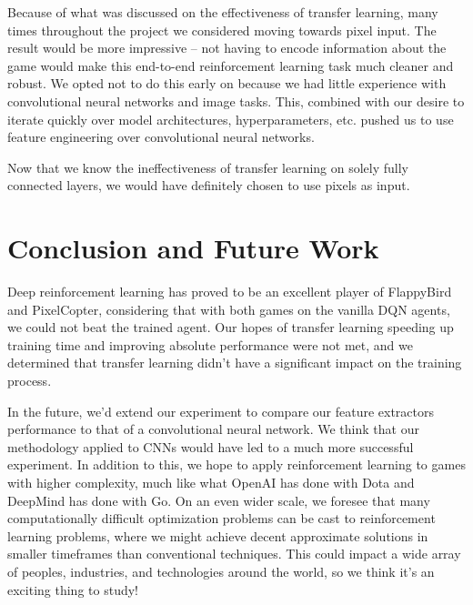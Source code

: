 \documentclass{article}
\begin{document}
Because of what was discussed on the effectiveness of transfer learning, many times throughout the project we considered moving towards pixel input. 
The result would be more impressive -- not having to encode information about the game would make this end-to-end reinforcement learning task much cleaner and robust.
We opted not to do this early on because we had little experience with convolutional neural networks and image tasks.
This, combined with our desire to iterate quickly over model architectures, hyperparameters, etc. pushed us to use feature engineering over convolutional neural networks. 

Now that we know the ineffectiveness of transfer learning on solely fully connected layers, we would have definitely chosen to use pixels as input.

\section{Conclusion and Future Work}
Deep reinforcement learning has proved to be an excellent player of FlappyBird and PixelCopter, considering that with both games on the vanilla DQN agents, we could not beat the trained agent.
Our hopes of transfer learning speeding up training time and improving absolute performance were not met, and we determined that transfer learning didn't have a significant impact on the training process.

In the future, we'd extend our experiment to compare our feature extractors performance to that of a convolutional neural network. 
We think that our methodology applied to CNNs would have led to a much more successful experiment. 
In addition to this, we hope to apply reinforcement learning to games with higher complexity, much like what OpenAI has done with Dota and DeepMind has done with Go.
On an even wider scale, we foresee that many computationally difficult optimization problems can be cast to reinforcement learning problems, where we might achieve decent approximate solutions in smaller timeframes than conventional techniques.
This could impact a wide array of peoples, industries, and technologies around the world, so we think it's an exciting thing to study!



\end{document}
